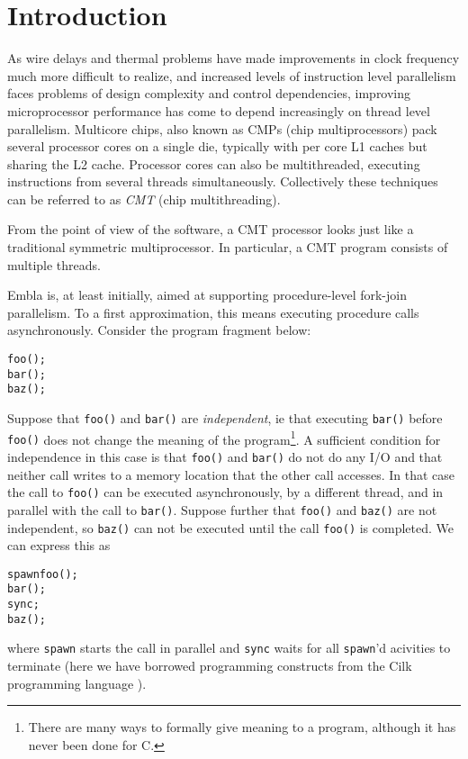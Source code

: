 \section{Introduction}

As wire delays and thermal problems have made improvements in clock
frequency much more difficult to realize, and increased levels of
instruction level parallelism faces problems of design complexity and
control dependencies, improving microprocessor performance has come to
depend increasingly on thread level parallelism. Multicore chips, also
known as CMPs (chip multiprocessors) pack several processor cores on a
single die, typically with per core L1 caches but sharing the L2
cache. Processor cores can also be multithreaded, executing
instructions from several threads simultaneously. Collectively 
these techniques can be referred to as {\em CMT} (chip multithreading).

From the point of view of the software, a CMT processor looks just
like a traditional symmetric multiprocessor. In particular, a CMT
program consists of multiple threads.



Embla is, at least initially, aimed at supporting procedure-level 
fork-join parallelism. To a first approximation, this means executing 
procedure calls asynchronously. Consider the program fragment below:
\begin{alltt}
   foo();
   bar();
   baz();
\end{alltt}
Suppose that {\tt foo()} and {\tt bar()} are {\em independent}, ie that 
executing {\tt bar()} before {\tt foo()} does not change the meaning of
the program\footnote{There are many ways to formally give meaning to a
program, although it has never been done for C.}. A sufficient condition 
for independence
in this case is that {\tt foo()} and {\tt bar()} do not do any I/O and
that neither call writes to a memory location that the other call 
accesses. In that case the call to {\tt foo()} can be executed
asynchronously, 
by a different thread, and in parallel with the call to {\tt bar()}.
Suppose further that {\tt foo()} and {\tt baz()} are not independent,
so {\tt baz()} can not be executed until the call {\tt foo()} is completed.
We can express this as 
\begin{alltt}
   spawn foo();
   bar();
   sync;
   baz();
\end{alltt}
where {\tt spawn} starts the call in parallel and {\tt sync} waits
for all {\tt spawn}'d acivities to terminate (here we have borrowed 
programming constructs from the Cilk programming language 
\cite{frigo98implementation}).

